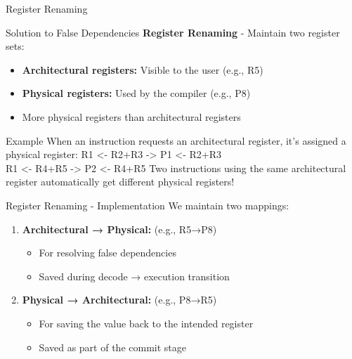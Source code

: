 \documentclass[aspectratio=169,12pt]{beamer}
\begin{document}
\begin{frame}{Register Renaming}
    \begin{block}{Solution to False Dependencies}
        \textbf{Register Renaming} - Maintain two register sets:
        \begin{itemize}
            \item \textbf{Architectural registers:} Visible to the user (e.g., R5)
            \item \textbf{Physical registers:} Used by the compiler (e.g., P8)
            \item More physical registers than architectural registers
        \end{itemize}
    \end{block}
    
    \begin{exampleblock}{Example}
        When an instruction requests an architectural register, it's assigned a physical register:
        {\ttfamily\small
        R1 <- R2+R3  ->  P1 <- R2+R3\\
        R1 <- R4+R5  ->  P2 <- R4+R5
        }
        Two instructions using the same architectural register automatically get different physical registers!
    \end{exampleblock}
\end{frame}

\begin{frame}{Register Renaming - Implementation}
    We maintain two mappings:
    
    \begin{enumerate}
        \item \textbf{Architectural → Physical:} (e.g., R5→P8)
        \begin{itemize}
            \item For resolving false dependencies
            \item Saved during decode → execution transition
        \end{itemize}
        
        \item \textbf{Physical → Architectural:} (e.g., P8→R5)
        \begin{itemize}
            \item For saving the value back to the intended register
            \item Saved as part of the commit stage
        \end{itemize}
    \end{enumerate}
\end{frame}
\end{document}

